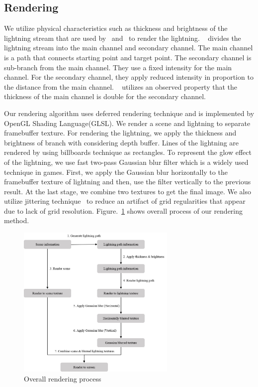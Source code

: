 \subsection{Rendering}

We utilize physical characteristics such as thickness and brightness of the lightning stream that are used by~\cite{Reed1994} and~\cite{Kim2004} to render the lightning. ~\cite{Kim2004} divides the lightning stream into the main channel and secondary channel. The main channel is a path that connects starting point and target point. The secondary channel is sub-branch from the main channel. They use a fixed intensity for the main channel. For the secondary channel, they apply reduced intensity in proportion to the distance from the main channel. ~\cite{Reed1994} utilizes an observed property that the thickness of the main channel is double for the secondary channel. 

Our rendering algorithm uses deferred rendering technique and is implemented by OpenGL Shading Language(GLSL). We render a scene and lightning to separate framebuffer texture. For rendering the lightning, we apply the thickness and brightness of branch with considering depth buffer. Lines of the lightning are rendered by using billboards technique as rectangles. To represent the glow effect of the lightning, we use fast two-pass Gaussian blur filter which is a widely used technique in games. First, we apply the Gaussian blur horizontally to the framebuffer texture of lightning and then, use the filter vertically to the previous result. At the last stage, we combine two textures to get the final image. We also utilize jittering technique~\cite{Kim2007} to reduce an artifact of grid regularities that appear due to lack of grid resolution. Figure.~\ref{fig_rendering_process} shows overall process of our rendering method.

\begin{figure}[h]
	\centering
	\includegraphics[width=3.0in]{fig/rendering_process}
	\caption{Overall rendering process}
	\label{fig_rendering_process}
\end{figure}

